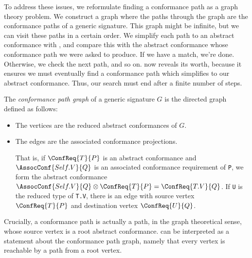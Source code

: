 \documentclass[../generics]{subfiles}
\begin{document}
To address these issues, we reformulate finding a conformance path as a graph theory problem. We construct a graph where the paths through the graph are the conformance paths of a generic signature. This graph might be infinite, but we can visit these paths in a certain order. We simplify each path to an abstract conformance with , and compare this with the abstract conformance whose conformance path we were asked to produce. If we have a match, we're done. Otherwise, we check the next path, and so on.  now reveals its worth, because it ensures we must eventually find a conformance path which simplifies to our abstract conformance. Thus, our search must end after a finite number of steps.

\begin{definition}
The \emph{conformance path graph} of a generic signature $G$ is the directed graph defined as follows:
\begin{itemize}
\item The vertices are the reduced abstract conformances of $G$.
\item The edges are the associated conformance projections.

That is, if $\ConfReq{T}{P}$ is an abstract conformance and $\AssocConf{Self.V}{Q}$ is an associated conformance requirement of \texttt{P}, we form the abstract conformance $\AssocConf{Self.V}{Q}\otimes \ConfReq{T}{P}=\ConfReq{T.V}{Q}$. If \texttt{U} is the reduced type of \texttt{T.V}, there is an edge with source vertex $\ConfReq{T}{P}$ and destination vertex $\ConfReq{U}{Q}$.
\end{itemize}

\vfill
\eject

Crucially, a conformance path is actually a path, in the graph theoretical sense, whose source vertex is a root abstract conformance.  can be interpreted as a statement about the conformance path graph, namely that every vertex is reachable by a path from a root vertex.
\end{definition}
\end{document}
